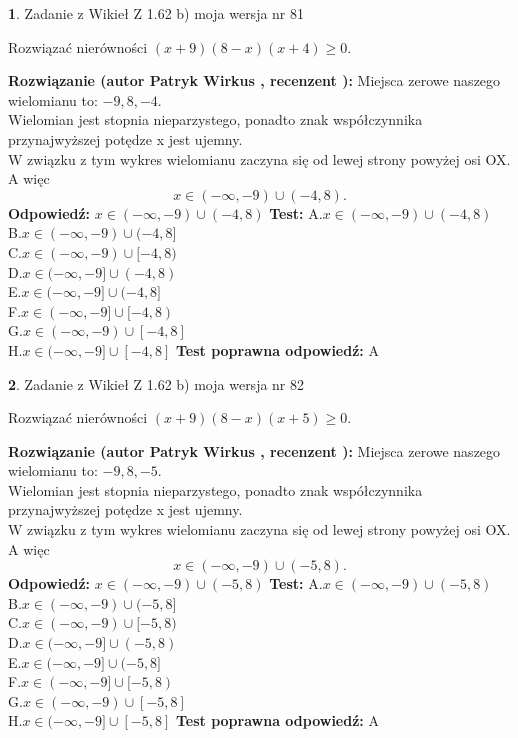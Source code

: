 \documentclass[12pt, a4paper]{article}
\theoremstyle{definition} %
\newtheorem{zad}{}
\newcommand{\zadStart}[1]{\begin{zad}#1\newline}
\newcommand{\zadStop}{\end{zad}}
\newcommand{\rozwStart}[2]{\noindent \textbf{Rozwiązanie (autor #1 , recenzent #2): }\newline}
\newcommand{\rozwStop}{\newline}
\newcommand{\odpStart}{\noindent \textbf{Odpowiedź:}\newline}
\newcommand{\odpStop}{\newline}
\newcommand{\testStart}{\noindent \textbf{Test:}\newline}
\newcommand{\testStop}{\newline}
\newcommand{\kluczStart}{\noindent \textbf{Test poprawna odpowiedź:}\newline}
\newcommand{\kluczStop}{\newline}
\begin{document}
\zadStart{Zadanie z Wikieł Z 1.62 b) moja wersja nr 81}

Rozwiązać nierówności $(x+9)(8-x)(x+4)\ge0$.
\zadStop
\rozwStart{Patryk Wirkus}{}
Miejsca zerowe naszego wielomianu to: $-9, 8, -4$.\\
Wielomian jest stopnia nieparzystego, ponadto znak współczynnika przy\linebreak najwyższej potędze x jest ujemny.\\ W związku z tym wykres wielomianu zaczyna się od lewej strony powyżej osi OX. A więc $$x \in (-\infty,-9) \cup (-4,8).$$
\rozwStop
\odpStart
$x \in (-\infty,-9) \cup (-4,8)$
\odpStop
\testStart
A.$x \in (-\infty,-9) \cup (-4,8)$\\
B.$x \in (-\infty,-9) \cup (-4,8]$\\
C.$x \in (-\infty,-9) \cup [-4,8)$\\
D.$x \in (-\infty,-9] \cup (-4,8)$\\
E.$x \in (-\infty,-9] \cup (-4,8]$\\
F.$x \in (-\infty,-9] \cup [-4,8)$\\
G.$x \in (-\infty,-9) \cup [-4,8]$\\
H.$x \in (-\infty,-9] \cup [-4,8]$
\testStop
\kluczStart
A
\kluczStop



\zadStart{Zadanie z Wikieł Z 1.62 b) moja wersja nr 82}

Rozwiązać nierówności $(x+9)(8-x)(x+5)\ge0$.
\zadStop
\rozwStart{Patryk Wirkus}{}
Miejsca zerowe naszego wielomianu to: $-9, 8, -5$.\\
Wielomian jest stopnia nieparzystego, ponadto znak współczynnika przy\linebreak najwyższej potędze x jest ujemny.\\ W związku z tym wykres wielomianu zaczyna się od lewej strony powyżej osi OX. A więc $$x \in (-\infty,-9) \cup (-5,8).$$
\rozwStop
\odpStart
$x \in (-\infty,-9) \cup (-5,8)$
\odpStop
\testStart
A.$x \in (-\infty,-9) \cup (-5,8)$\\
B.$x \in (-\infty,-9) \cup (-5,8]$\\
C.$x \in (-\infty,-9) \cup [-5,8)$\\
D.$x \in (-\infty,-9] \cup (-5,8)$\\
E.$x \in (-\infty,-9] \cup (-5,8]$\\
F.$x \in (-\infty,-9] \cup [-5,8)$\\
G.$x \in (-\infty,-9) \cup [-5,8]$\\
H.$x \in (-\infty,-9] \cup [-5,8]$
\testStop
\kluczStart
A
\kluczStop
\end{document}
